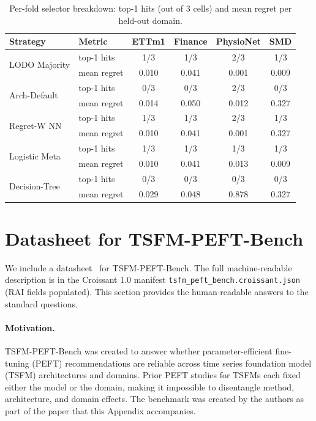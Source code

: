 \begin{table}[ht]
\centering
\caption{Per-fold selector breakdown: top-1 hits (out of 3 cells) and mean regret per held-out domain.}
\label{tab:selector-fold}
\small
\begin{tabular}{ll cccc}
\toprule
Strategy & Metric & ETTm1 & Finance & PhysioNet & SMD \\
\midrule
\multirow{2}{*}{LODO Majority}
 & top-1 hits & 1/3 & 1/3 & 2/3 & 1/3 \\
 & mean regret & 0.010 & 0.041 & 0.001 & 0.009 \\
\midrule
\multirow{2}{*}{Arch-Default}
 & top-1 hits & 0/3 & 0/3 & 2/3 & 0/3 \\
 & mean regret & 0.014 & 0.050 & 0.012 & 0.327 \\
\midrule
\multirow{2}{*}{Regret-W NN}
 & top-1 hits & 1/3 & 1/3 & 2/3 & 1/3 \\
 & mean regret & 0.010 & 0.041 & 0.001 & 0.327 \\
\midrule
\multirow{2}{*}{Logistic Meta}
 & top-1 hits & 1/3 & 1/3 & 1/3 & 1/3 \\
 & mean regret & 0.010 & 0.041 & 0.013 & 0.009 \\
\midrule
\multirow{2}{*}{Decision-Tree}
 & top-1 hits & 0/3 & 0/3 & 0/3 & 0/3 \\
 & mean regret & 0.029 & 0.048 & 0.878 & 0.327 \\
\bottomrule
\end{tabular}
\end{table}

\section{Datasheet for TSFM-PEFT-Bench}
\label{sec:datasheet}
We include a datasheet~\citep{gebru2021datasheets} for TSFM-PEFT-Bench. The full machine-readable description is in the Croissant 1.0 manifest \texttt{tsfm\_peft\_bench.croissant.json} (RAI fields populated). This section provides the human-readable answers to the standard questions.

\paragraph{Motivation.} TSFM-PEFT-Bench was created to answer whether parameter-efficient fine-tuning (PEFT) recommendations are reliable across time series foundation model (TSFM) architectures and domains. Prior PEFT studies for TSFMs each fixed either the model or the domain, making it impossible to disentangle method, architecture, and domain effects. The benchmark was created by the authors as part of the paper that this Appendix accompanies.

